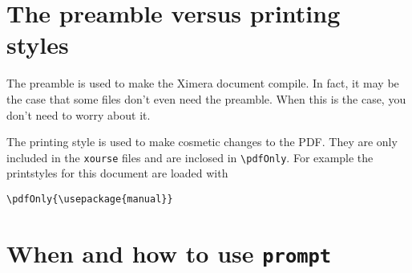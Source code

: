 \documentclass{ximera}
\begin{document}
\section{The preamble versus printing styles}

The preamble is used to make the Ximera document compile. In fact, it may be
the case that some files don't even need the preamble. When this is the case,
you don't need to worry about it.

The printing style is used to make cosmetic changes to the PDF. They are only
included in the \verb!xourse! files and are inclosed in \verb!\pdfOnly!. For
example the printstyles for this document are loaded with
\begin{verbatim}
\pdfOnly{\usepackage{manual}}
\end{verbatim}

\section{When and how to use \texttt{prompt}}
\end{document}
